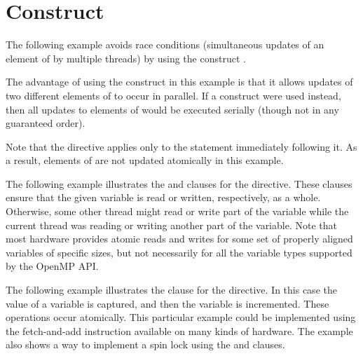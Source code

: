 \pagebreak
\section{ Construct}
\label{sec:atomic}

The following example avoids race conditions (simultaneous updates of an element 
of  by multiple threads) by using the  construct .

The advantage of using the  construct in this example is that it 
allows updates of two different elements of  to occur in parallel. If 
a  construct were used instead, then all updates to elements of 
 would be executed serially (though not in any guaranteed order).

Note that the  directive applies only to the statement immediately 
following it. As a result, elements of  are not updated atomically in 
this example.



The following example illustrates the  and   clauses 
for the  directive. These clauses ensure that the given variable 
is read or written, respectively, as a whole. Otherwise, some other thread might 
read or write part of the variable while the current thread was reading or writing 
another part of the variable. Note that most hardware provides atomic reads and 
writes for some set of properly aligned variables of specific sizes, but not necessarily 
for all the variable types supported by the OpenMP API.



The following example illustrates the  clause for the  
directive. In this case the value of a variable is captured, and then the variable 
is incremented. These operations occur atomically. This particular example could 
be implemented using the fetch-and-add instruction available on many kinds of hardware. 
The example also shows a way to implement a spin lock using the  
 and  clauses.




